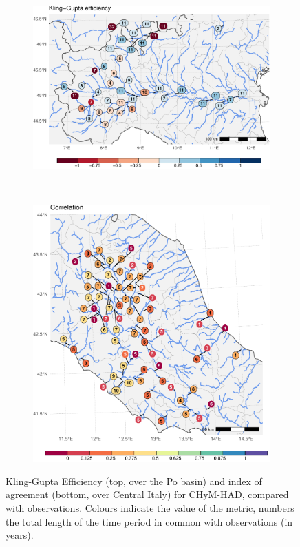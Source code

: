 \begin{figure}
    \centering
    \begin{subfigure}{0.7\textwidth}
        \includegraphics[width=\textwidth]{figures/valid_Q/metrics/regcm-nn_reg1_22_KGE}
    \end{subfigure}\\
    \begin{subfigure}{0.7\textwidth}
        \includegraphics[width=\textwidth]{figures/valid_Q/metrics/regcm-nn_reg3_22_r}
    \end{subfigure}
    \decoRule
    \caption[CHyM (RegCM-HadGEM) performance metrics]{
        Kling-Gupta Efficiency (top, over the Po basin) and index of agreement (bottom, over Central Italy) for CHyM-HAD, compared with observations. Colours indicate the value of the metric, numbers the total length of the time period in common with observations (in years).
    }\label{fig:valid_q_regcm}
\end{figure}

